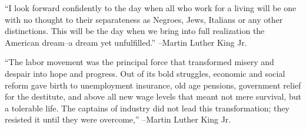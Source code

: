 \documentclass{article}%
\begin{document}
\linebreak%
\vspace{1mm}%
\begin{minipage}{\textwidth}%
\flushleft%
“I look forward confidently to the day when all who work for a living will be one with no thought to their separateness as Negroes, Jews, Italians or any other distinctions. This will be the day when we bring into full realization the American dream–a dream yet unfulfilled.”%
\linebreak%
\vspace{1mm}%
–Martin Luther King Jr.%
\linebreak%
\vspace{1mm}%
\end{minipage}%
\linebreak%
\vspace{1mm}%
\begin{minipage}{\textwidth}%
\flushleft%
“The labor movement was the principal force that transformed misery and despair into hope and progress. Out of its bold struggles, economic and social reform gave birth to unemployment insurance, old age pensions, government relief for the destitute, and above all new wage levels that meant not mere survival, but a tolerable life. The captains of industry did not lead this transformation; they resisted it until they were overcome,”%
\linebreak%
\vspace{1mm}%
–Martin Luther King Jr.%
\linebreak%
\vspace{1mm}%
\end{minipage}%
\linebreak%
\vspace{1mm}%
\end{document}
